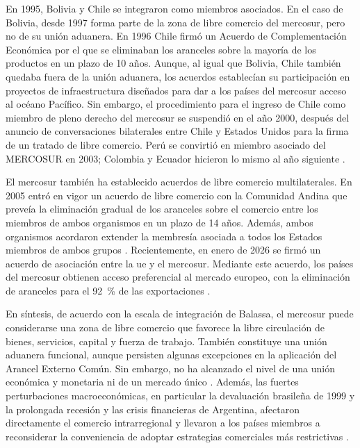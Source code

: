 En 1995, Bolivia y Chile se integraron como miembros asociados. En el caso de Bolivia, desde 1997 forma parte de la zona de libre comercio del \gls{mercosur}, pero no de su unión aduanera. En 1996 Chile firmó un Acuerdo de Complementación Económica por el que se eliminaban los aranceles sobre la mayoría de los productos en un plazo de 10 años. Aunque, al igual que Bolivia, Chile también quedaba fuera de la unión aduanera, los acuerdos establecían su participación en proyectos de infraestructura diseñados para dar a los países del \gls{mercosur} acceso al océano Pacífico. Sin embargo, el procedimiento para el ingreso de Chile como miembro de pleno derecho del \gls{mercosur} se suspendió en el año 2000, después del anuncio de conversaciones bilaterales entre Chile y Estados Unidos para la firma de un tratado de libre comercio. Perú se convirtió en miembro asociado del MERCOSUR en 2003; Colombia y Ecuador hicieron lo mismo al año siguiente \parencite[p.~770]{EuropaDirectory2022}.

El \gls{mercosur} también ha establecido acuerdos de libre comercio multilaterales. En 2005 entró en vigor un acuerdo de libre comercio con la Comunidad Andina que preveía la eliminación gradual de los aranceles sobre el comercio entre los miembros de ambos organismos en un plazo de 14 años. Además, ambos organismos acordaron extender la membresía asociada a todos los Estados miembros de ambos grupos \parencite[p.~771]{EuropaDirectory2022}. Recientemente, en enero de 2026 se firmó un acuerdo de asociación entre la \gls{ue} y el \gls{mercosur}. Mediante este acuerdo, los países del \gls{mercosur} obtienen acceso preferencial al mercado europeo, con la eliminación de aranceles para el 92~\% de las exportaciones \parencite{MERCOSUR_UE}.

En síntesis, de acuerdo con la escala de integración de Balassa, el \gls{mercosur} puede considerarse una zona de libre comercio que favorece la libre circulación de bienes, servicios, capital y fuerza de trabajo. También constituye una unión aduanera funcional, aunque persisten algunas excepciones en la aplicación del Arancel Externo Común. Sin embargo, no ha alcanzado el nivel de una unión económica y monetaria ni de un mercado único \parencite[p.~206]{Lakos2025}. Además, las fuertes perturbaciones macroeconómicas, en particular la devaluación brasileña de 1999 y la prolongada recesión y las crisis financieras de Argentina, afectaron directamente el comercio intrarregional y llevaron a los países miembros a reconsiderar la conveniencia de adoptar estrategias comerciales más restrictivas \parencite{Heymann2001}.


